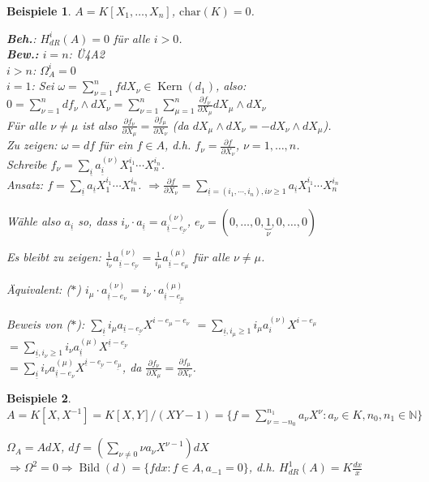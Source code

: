 \documentclass[a4paper,12pt]{scrbook}
\theoremstyle{break}
\theoremstyle{nonumberbreak}
\newtheorem{nnBsp}{Beispiele}
\theoremstyle{nonumberplain}
\DeclareMathOperator{\Kern}{Kern}
\DeclareMathOperator{\Bild}{Bild}
\begin{document}
\begin{nnBsp}
$A=K[X_1, \ldots, X_n]$, $\textrm{char}(K)=0$.

\textbf{Beh.}: $H_{dR}^i(A) = 0$ für alle $i>0$.\\
\textbf{Bew.: } $i=n$: Ü4A2\\
$i>n$: $\Omega_A^i=0$\\
$i=1$: Sei $\omega=\sum_{\nu=1}^nf dX_\nu\in \Kern(d_1)$, also:
$0=\sum_{\nu=1}^n df_\nu \wedge dX_\nu=\sum_{\nu=1}^n\sum_{\mu=1}^n\frac{\partial f_\nu}{\partial X_\mu}dX_\mu\wedge dX_\nu$\\
Für alle $\nu\neq \mu$ ist also $\frac{\partial f_\nu}{\partial X_\mu}=\frac{\partial f_\mu}{\partial X_\nu}$ 
(da $dX_\mu\wedge dX_\nu = -dX_\nu\wedge dX_\mu$).\\
Zu zeigen: $\omega = df$ für ein $f\in A$, d.h. $f_\nu=\frac{\partial f}{\partial X_\nu}$, $\nu=1, \ldots, n$.\\
Schreibe $f_\nu=\sum_{\underline{i}} a_{\underline{i}}^{(\nu)}X_1^{i_1}\cdots X_n^{i_n}$.\\
Ansatz: $f=\sum_{\underline{i}} a_{\underline{i}} X_1^{i_1}\cdots X_n^{i_n}$.
$\Rightarrow \frac{\partial f}{\partial X_\nu}
=\sum_{\underline{i}=(i_1, \cdots, i_n), i\nu\geq 1}a_{\underline{i}} X_1^{i_1}\cdots X_n^{i_n}$

Wähle also $a_{\underline{i}}$ so, dass $i_\nu\cdot a_{\underline{i}} = a_{\underline{i}-\underline{e_\nu}}^{(\nu)}$, 
$e_\nu=(0,\ldots,0,\underbrace{1}_{\nu},0,\ldots, 0)$

Es bleibt zu zeigen: $\frac{1}{i_\nu} a_{\underline{i}-\underline{e_\nu}}^{(\nu)}
=\frac{1}{i_\mu} a_{\underline{i}-e_\mu}^{(\mu)}$ für alle $\nu\neq \mu$.

Äquivalent: ($\ast$) $i_\mu\cdot a_{\underline{i}-e_{\nu}}^{(\nu)}=i_\nu \cdot a_{\underline{i}-\underline{e_\mu}}^{(\mu)}$

Beweis von ($\ast$): $\sum_{\underline{i}} i_\mu a_{\underline{i}-\underline{e_\nu}}X^{i-e_\mu-e_\nu}$
$= \sum_{\underline{i}, i_\mu\geq 1} i_\mu a_{i}^{(\nu)} X^{i-e_\mu}$
$= \sum_{\underline{i}, i_\nu\geq 1}i_\nu a_{\underline{i}}^{(\mu)}X^{\underline{i}-\underline{e_\nu}}$\\
$= \sum_{\underline{i}} i_\nu a_{\underline{i}-e_\nu}^{(\mu)}X^{\underline{i}-\underline{e_\nu}-\underline{e_\mu}}$,
da $\frac{\partial f_\nu}{\partial X_\mu} = \frac{\partial f_\mu}{\partial X_\nu}$.
\end{nnBsp}

\begin{nnBsp}
$A=K[X, X^{-1}]=K[X,Y]/(XY-1)=\{f=\sum_{\nu=-n_0}^{n_1} a_\nu X^\nu: a_\nu\in K, n_0, n_1\in \mathbb{N}\}$

$\Omega_A=AdX$, $df=(\sum_{\nu\neq 0}\nu a_\nu X^{\nu-1})dX$
$\Rightarrow \Omega^2 = 0 \Rightarrow \Bild(d)=\{fdx:f\in A, a_{-1}=0\}$,
d.h. $H_{dR}^{1}(A) = K\frac{dx}{x}$
\end{nnBsp}
\end{document}
